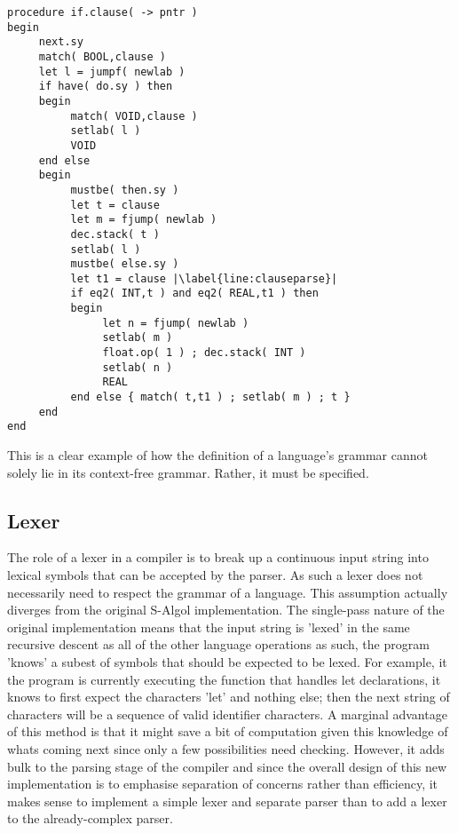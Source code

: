 \documentclass{article}
\begin{document}
\begin{lstlisting}[caption={S-Algol compiler implementation of parsing an 'if' statement},label={lst:ifclause}, escapechar="|"]
procedure if.clause( -> pntr )
begin
     next.sy
     match( BOOL,clause )
     let l = jumpf( newlab )
     if have( do.sy ) then
     begin
          match( VOID,clause )
          setlab( l )
          VOID
     end else
     begin
          mustbe( then.sy )
          let t = clause
          let m = fjump( newlab )
          dec.stack( t )
          setlab( l )
          mustbe( else.sy )
          let t1 = clause |\label{line:clauseparse}|
          if eq2( INT,t ) and eq2( REAL,t1 ) then
          begin
               let n = fjump( newlab )
               setlab( m )
               float.op( 1 ) ; dec.stack( INT )
               setlab( n )
               REAL
          end else { match( t,t1 ) ; setlab( m ) ; t }
     end
end
\end{lstlisting}

This is a clear example of how the definition of a language's grammar cannot solely lie in its context-free grammar. Rather, it must be specified.

\subsection{Lexer}

The role of a lexer in a compiler is to break up a continuous input string into lexical symbols that can be accepted by the parser. As such a lexer does not necessarily need to respect the grammar of a language. This assumption actually diverges from the original S-Algol implementation. The single-pass nature of the original implementation means that the input string is 'lexed' in the same recursive descent as all of the other language operations as such, the program 'knows' a subest of symbols that should be expected to be lexed. For example, it the program is currently executing the function that handles let declarations, it knows to first expect the characters 'let' and nothing else; then the next string of characters will be a sequence of valid identifier characters. A marginal advantage of this method is that it might save a bit of computation given this knowledge of whats coming next since only a few possibilities need checking. However, it adds bulk to the parsing stage of the compiler and since the overall design of this new implementation is to emphasise separation of concerns rather than efficiency, it makes sense to implement a simple lexer and separate parser than to add a lexer to the already-complex parser.
\end{document}
